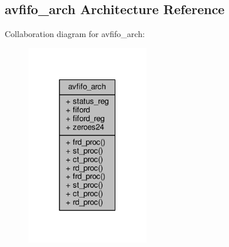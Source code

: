 \subsection{avfifo\+\_\+arch Architecture Reference}
\label{classavfifo_1_1avfifo__arch}


Collaboration diagram for avfifo\+\_\+arch\+:\nopagebreak
\begin{figure}[H]
\begin{center}
\leavevmode
\includegraphics[width=151pt]{df/db5/classavfifo_1_1avfifo__arch__coll__graph}
\end{center}
\end{figure}
